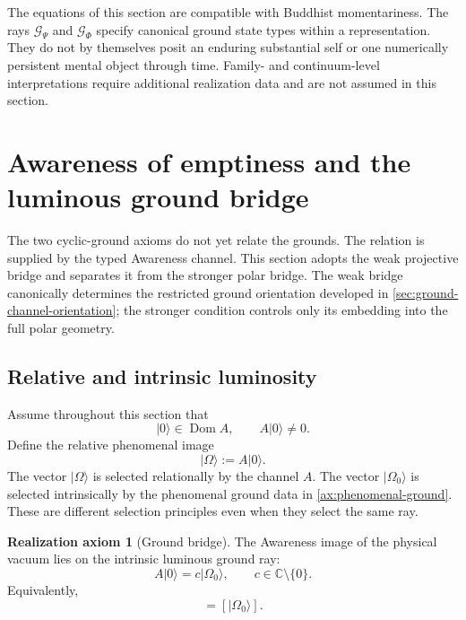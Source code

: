\documentclass[11pt,reqno]{scrartcl}
\newcommand{\CC}{\mathbb C}
\newcommand{\ket}[1]{\lvert #1\rangle}
\DeclareMathOperator{\Dom}{Dom}
\theoremstyle{plain}
\theoremstyle{definition}
\newtheorem{axiom}[axiom]{Realization axiom}
\theoremstyle{remark}
\begin{document}
The equations of this section are compatible with Buddhist momentariness.
The rays $\mathscr G_{\Psi}$ and $\mathscr G_{\Phi}$ specify canonical ground
state types within a representation.  They do not by themselves posit an
enduring substantial self or one numerically persistent mental object through
time.  Family- and continuum-level interpretations require additional
realization data and are not assumed in this section.
\section{Awareness of emptiness and the luminous ground bridge}
\label{sec:ground-bridge}

The two cyclic-ground axioms do not yet relate the grounds.  The relation is
supplied by the typed Awareness channel.  This section adopts the weak
projective bridge and separates it from the stronger polar bridge.  The weak
bridge canonically determines the restricted ground orientation developed in
\cref{sec:ground-channel-orientation}; the stronger condition controls only its
embedding into the full polar geometry.

\subsection{Relative and intrinsic luminosity}

Assume throughout this section that
\begin{equation}
  \ket0\in\Dom A,
  \qquad
  A\ket0\neq0.
  \label{eq:vacuum-in-A-domain}
\end{equation}
Define the relative phenomenal image
\begin{equation}
  \boxed{\ket\Omega:=A\ket0.}
  \label{eq:relative-Omega}
\end{equation}
The vector $\ket\Omega$ is selected relationally by the channel $A$.  The
vector $\ket{\Omega_0}$ is selected intrinsically by the phenomenal ground
data in \cref{ax:phenomenal-ground}.  These are different selection
principles even when they select the same ray.

\begin{axiom}[Ground bridge]
\label{ax:ground-bridge}
The Awareness image of the physical vacuum lies on the intrinsic luminous
ground ray:
\begin{equation}
  \boxed{
  A\ket0=c\ket{\Omega_0},
  \qquad c\in\CC\setminus\{0\}.}
  \label{eq:ground-bridge-axiom}
\end{equation}
Equivalently,
\begin{equation}
  [\ket\Omega]=[\ket{\Omega_0}].
  \label{eq:ground-bridge-rays}
\end{equation}
\end{axiom}
\end{document}
